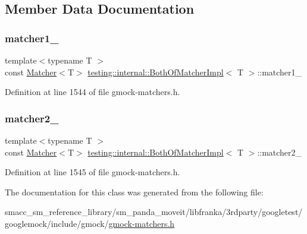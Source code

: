 \subsection{Member Data Documentation}
\mbox{\label{classtesting_1_1internal_1_1BothOfMatcherImpl_a31f8739f880776e209a3e5bd96ddfbf6}} 
\subsubsection{\texorpdfstring{matcher1\+\_\+}{matcher1\_}}
{\footnotesize\ttfamily template$<$typename T $>$ \\
const \hyperlink{classtesting_1_1Matcher}{Matcher}$<$T$>$ \hyperlink{classtesting_1_1internal_1_1BothOfMatcherImpl}{testing\+::internal\+::\+Both\+Of\+Matcher\+Impl}$<$ T $>$\+::matcher1\+\_\+\hspace{0.3cm}{\ttfamily [private]}}



Definition at line 1544 of file gmock-\/matchers.\+h.

\mbox{\label{classtesting_1_1internal_1_1BothOfMatcherImpl_aeb19d68ac4732ad2ca45a9d37ad955cb}} 
\subsubsection{\texorpdfstring{matcher2\+\_\+}{matcher2\_}}
{\footnotesize\ttfamily template$<$typename T $>$ \\
const \hyperlink{classtesting_1_1Matcher}{Matcher}$<$T$>$ \hyperlink{classtesting_1_1internal_1_1BothOfMatcherImpl}{testing\+::internal\+::\+Both\+Of\+Matcher\+Impl}$<$ T $>$\+::matcher2\+\_\+\hspace{0.3cm}{\ttfamily [private]}}



Definition at line 1545 of file gmock-\/matchers.\+h.



The documentation for this class was generated from the following file\+:\begin{DoxyCompactItemize}
\item 
smacc\+\_\+sm\+\_\+reference\+\_\+library/sm\+\_\+panda\+\_\+moveit/libfranka/3rdparty/googletest/googlemock/include/gmock/\hyperlink{gmock-matchers_8h}{gmock-\/matchers.\+h}\end{DoxyCompactItemize}
